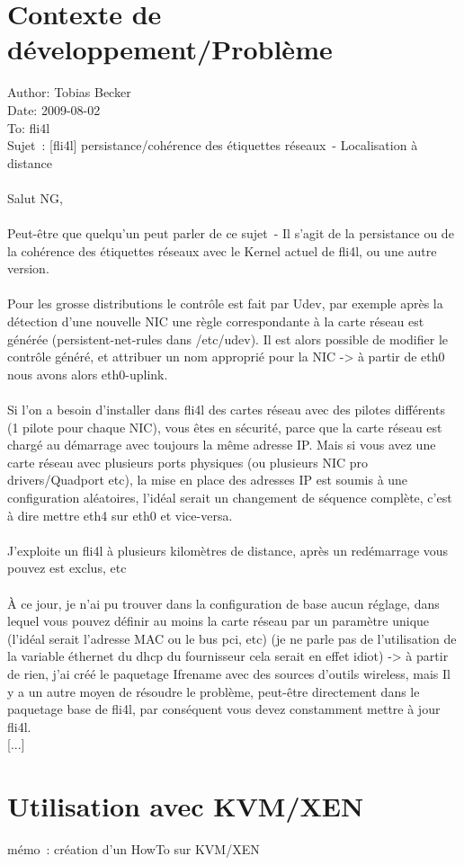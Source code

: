

\section {Contexte de développement/Problème}

Author: Tobias Becker\\
Date: 2009-08-02\\
To: fli4l\\
Sujet~: [fli4l] persistance/cohérence des étiquettes réseaux~- Localisation à distance\\
\\
Salut NG,\\
\\
Peut-être que quelqu'un peut parler de ce sujet~- Il s'agit de la persistance
ou de la cohérence des étiquettes réseaux avec le Kernel actuel de fli4l, ou
une autre version.\\
\\
Pour les grosse distributions le contrôle est fait par Udev, par exemple après
la détection d'une nouvelle NIC une règle correspondante à la carte réseau est
générée (persistent-net-rules dans /etc/udev). Il est alors possible de modifier
le contrôle généré, et attribuer un nom approprié pour la NIC -> à partir de
eth0 nous avons alors eth0-uplink.\\
\\
Si l'on a besoin d'installer dans fli4l des cartes réseau avec des pilotes
différents (1 pilote pour chaque NIC), vous êtes en sécurité, parce que la
carte réseau est chargé au démarrage avec toujours la même adresse IP. Mais
si vous avez une carte réseau avec plusieurs ports physiques (ou plusieurs NIC
pro drivers/Quadport etc), la mise en place des adresses IP est soumis à une
configuration aléatoires, l'idéal serait un changement de séquence complète,
c'est à dire mettre eth4 sur eth0 et vice-versa.\\
\\
J'exploite un fli4l à plusieurs kilomètres de distance, après un redémarrage
vous pouvez est exclus, etc\\
\\
À ce jour, je n'ai pu trouver dans la configuration de base aucun réglage, dans 
lequel vous pouvez définir au moins la carte réseau par un paramètre unique
(l'idéal serait l'adresse MAC ou le bus pci, etc) (je ne parle pas de l'utilisation
de la variable éthernet du dhcp du fournisseur cela serait en effet idiot)
-> à partir de rien, j'ai créé le paquetage Ifrename avec des sources d'outils
wireless, mais Il y a un autre moyen de résoudre le problème, peut-être
directement dans le paquetage base de fli4l, par conséquent vous devez constamment
mettre à jour fli4l.\\

[...]

\section {Utilisation avec KVM/XEN}
  mémo~: création d'un HowTo sur KVM/XEN 
